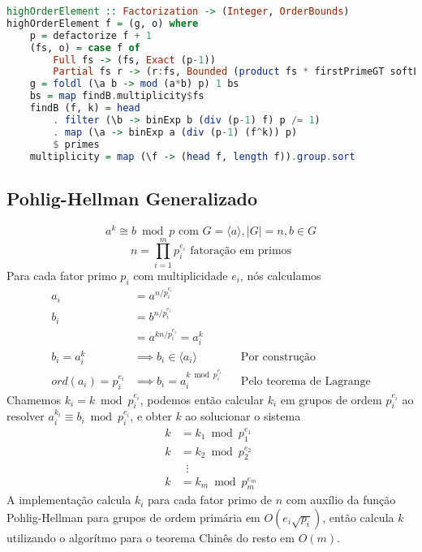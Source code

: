 \documentclass{article}
\begin{document}
\noindent\hspace{0.03\linewidth}
\begin{minipage}{.9\linewidth}
\begin{lstlisting}[language=haskell,caption=Algoritmo de Gauss]
highOrderElement :: Factorization -> (Integer, OrderBounds)
highOrderElement f = (g, o) where
    p = defactorize f + 1
    (fs, o) = case f of
        Full fs -> (fs, Exact (p-1))
        Partial fs r -> (r:fs, Bounded (product fs * firstPrimeGT softLimit) (p-1))
    g = foldl (\a b -> mod (a*b) p) 1 bs
    bs = map findB.multiplicity$fs
    findB (f, k) = head
        . filter (\b -> binExp b (div (p-1) f) p /= 1)
        . map (\a -> binExp a (div (p-1) (f^k)) p)
        $ primes
    multiplicity = map (\f -> (head f, length f)).group.sort

\end{lstlisting}
\end{minipage}

\subsection{Pohlig-Hellman Generalizado}
$$ a^k \cong b \bmod p \text{ com } G = \langle a \rangle, |G| = n, b \in G$$
$$ n = \prod_{i=1}^{m}p_i^{e_i} \text{ fatoração em primos} $$
Para cada fator primo $p_i$ com multiplicidade $e_i$, nós calculamos
\begin{align*}
    a_i &= a^{n/p_i^{e_i}}\\
    b_i &= b^{n/p_i^{e_i}}\\
        &= a^{k n/p_i^{e_i}} = a_i^k\\
    b_i = a_i^k &\implies b_i \in \langle a_i \rangle            &&\text{Por construção}\\
    ord(a_i) = p_i^{e_i} &\implies b_i = a_i^{k \bmod p_i^{e_i}} &&\text{Pelo teorema de Lagrange}
\end{align*}
Chamemos $ k_i = k \bmod p_i^{e_i} $, podemos então calcular $k_i$ em grupos de ordem $p_i^{e_i}$ ao resolver $a_i^{k_i} \equiv b_i \bmod p_i^{e_i}$, e obter $k$ ao solucionar o sistema
\begin{align*}
    k &= k_1 \bmod p_1^{e_1} \\
    k &= k_2 \bmod p_2^{e_2} \\
    &\;\;\vdots \\
    k &= k_m \bmod p_m^{e_m}
\end{align*}
A implementação calcula $k_i$ para cada fator primo de $n$ com auxílio da função Pohlig-Hellman para grupos de ordem primária em $O(e_i\sqrt{p_i})$, então calcula $k$ utilizando o algorítmo para o teorema Chinês do resto em $O(m)$.
\end{document}
